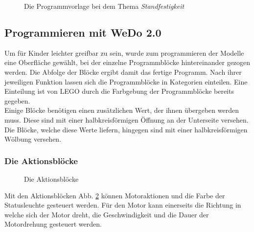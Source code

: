 \begin{figure}[htbp!]
	\centering
	\caption[Die Programmvorlage]{Die Programmvorlage bei dem Thema \textit{Standfestigkeit}}
	\label{img:programtemplate}
\end{figure} 

\subsection{Programmieren mit WeDo 2.0}\label{WedoSoftware}
Um für Kinder leichter greifbar zu sein, wurde zum programmieren der Modelle eine Oberfläche gewählt, bei der einzelne Programmblöcke hintereinander gezogen werden. Die Abfolge der Blöcke ergibt damit das fertige Programm. Nach ihrer jeweiligen Funktion lassen sich die Programmblöcke in Kategorien einteilen. Eine Einteilung ist von LEGO durch die Farbgebung der Programmblöcke bereits gegeben. \\
Einige Blöcke benötigen einen zusätzlichen Wert, der ihnen übergeben werden muss. Diese sind mit einer halbkreisförmigen Öffnung an der Unterseite versehen. Die Blöcke, welche diese Werte liefern, hingegen sind mit einer halbkreisförmigen Wölbung versehen. 

\subsubsection{Die Aktionsblöcke}
\begin{figure}[htbp!]
	\centering
	\caption[Die Aktionsblöcke]{Die Aktionsblöcke} %
	\label{img:Aktionsblöcke}
\end{figure}

Mit den Aktionsblöcken Abb. \ref{img:Aktionsblöcke} können Motoraktionen und die Farbe der Statusleuchte gesteuert werden. Für den Motor kann einerseits die Richtung in welche sich der Motor dreht, die Geschwindigkeit und die Dauer der Motordrehung gesteuert werden.

